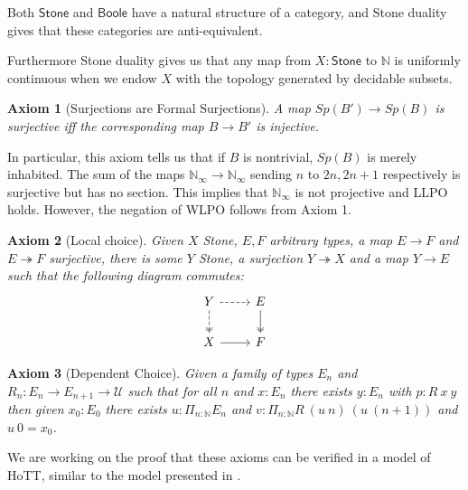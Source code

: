 \documentclass[letterpaper]{../../util/easychair}
\newtheorem{axiom}{Axiom}
\newcommand{\N}{\mathbb{N}}
\newcommand{\Boole}{\mathsf{Boole}}
\newcommand{\Stone}{\mathsf{Stone}}
\newcommand{\Noo}{\N_{\infty}}
\newcommand{\ints}{\mathbb{Z}}
\begin{document}
Both $\Stone$ and $\Boole$ have a natural structure of a category, and 
Stone duality gives that these categories are anti-equivalent. 

Furthermore Stone duality gives us that any map from $X:\Stone$ to $\mathbb N$ is uniformly continuous
when we endow $X$ with the topology generated by decidable subsets. 

\begin{axiom}[Surjections are Formal Surjections]
  A map $Sp(B')\to Sp(B)$ is surjective iff the corresponding map $B \to B'$ is injective.
\end{axiom} 
In particular, this axiom tells us that if $B$ is nontrivial, 
$Sp(B)$ is merely inhabited.
%
%
The sum of the maps
$\Noo \to \Noo$
sending $n$ to $2n,2n+1$ respectively
is surjective but has no section. 
This implies that $\Noo$ is not projective and LLPO holds. 
However, the negation of WLPO follows from Axiom 1.  

\begin{axiom}[Local choice]
  Given $X$ Stone, $E,F$ arbitrary types, a map $E \to F$ and $E\twoheadrightarrow F$ surjective, 
  there is some $Y$ Stone,
    a surjection $Y \twoheadrightarrow X$ and a map $Y\to E$ such that the following diagram commutes:
    \begin{equation*}\begin{tikzcd}
      Y \arrow [d, two heads,dashed] \arrow [r,dashed] & E \arrow[d,""',two heads]\\
      X \arrow[r] & F
    \end{tikzcd}\end{equation*}  
\end{axiom} 

\begin{axiom}[Dependent Choice]
  Given a family of types $E_n$ and $R_n:E_n\rightarrow E_{n+1}\rightarrow {\mathcal U}$ such that
  for all $n$ and $x:E_n$ there exists $y:E_n$ with $p:R~x~y$ then given $x_0:E_0$ there exists
  $u:\Pi_{n:\N}E_n$ and $v:\Pi_{n:\N}R~(u~n)~(u~(n+1))$ and $u~0 = x_0$.
\end{axiom}
%
%
We are working on the proof that these axioms can be verified in a model of HoTT, similar
to the model presented in \cite{draft}.

\printbibliography
\end{document}
